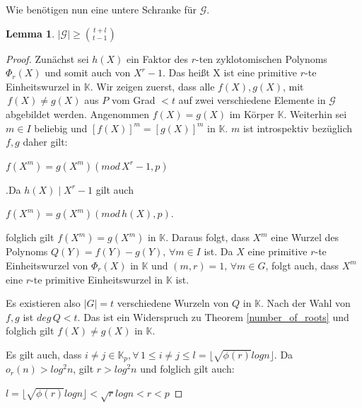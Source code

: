 \documentclass[12pt,oneside]{article}
\newtheorem{lemma}[theorem]{Lemma}
\theoremstyle{remark}
\theoremstyle{definition}
\begin{document}
Wie benötigen nun eine untere Schranke für $\mathcal{G}$.

\begin{lemma}\label{lemma47}
$|\mathcal{G}| \geq {t + l \choose t - 1}$
\end{lemma}

\begin{proof}
Zunächst sei $h(X)$ ein Faktor des $r$-ten zyklotomischen Polynoms $\Phi_r (X)$ und somit auch von $X^r - 1$. Das heißt X ist eine primitive $r$-te Einheitswurzel in $\mathbb{K}$. Wir zeigen zuerst, dass alle $f(X),g(X)$, mit $\, f(X) \neq g(X)$ aus $P$ vom Grad $ < t$ auf zwei verschiedene Elemente in $\mathcal{G}$ abgebildet werden.\newline\newline
Angenommen $f(X) = g(X)$ im Körper $\mathbb{K}$. Weiterhin sei $m \in I$ beliebig und $[f(X)]^m = [g(X)]^m$ in $\mathbb{K}$. $m$ ist introspektiv bezüglich $f, g$ daher gilt:\newline\newline
\centerline{$f(X^m) = g(X^m) (mod \, X^r - 1,p)$}.\newline\newline Da $h(X) \mid X^r - 1$ gilt auch\newline\newline
\centerline{$f(X^m) = g(X^m) (mod \, h(X),p)$.}\newline



folglich gilt $f(X^m) = g(X^m)$ in $\mathbb{K}$. Daraus folgt, dass $X^m$ eine Wurzel des Polynoms $Q(Y) = f(Y) - g(Y), \, \forall m \in I$ ist. Da $X$ eine primitive $r$-te Einheitswurzel von $\Phi_r(X)$ in $\mathbb{K}$ und $(m,r) = 1, \, \forall m \in G$, folgt auch, dass $X^m$ eine $r$-te primitive Einheitswurzel in $\mathbb{K}$ ist.

Es existieren also $|G| = t$ verschiedene Wurzeln von $Q$ in $\mathbb{K}$. Nach der Wahl von $f,g$ ist $deg \, Q < t$. Das ist ein Widerspruch zu Theorem \ref{number_of_roots} und folglich gilt $f(X) \neq g(X)$ in $\mathbb{K}$.

Es gilt auch, dass $i \neq j  \in \mathbb{K}_p, \forall \, 1 \leq i \neq j \leq l = \lfloor \sqrt{\phi(r)} log n \rfloor$. Da $o_r(n) > log^2 n$, gilt $r > log^2 n$ und folglich gilt auch:\newline\newline
\centerline{$l = \lfloor \sqrt{\phi(r)} log n \rfloor < \sqrt{r} log n < r < p$}


\end{proof}
\end{document}
